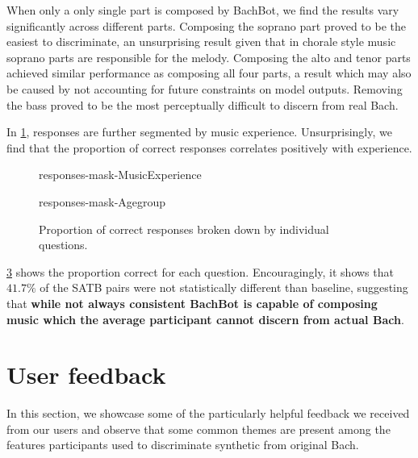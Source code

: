 When only a only single part is composed by BachBot, we find the results vary significantly
across different parts. Composing the soprano part proved to be the easiest to
discriminate, an unsurprising result given that in chorale style music soprano parts
are responsible for the melody. Composing the alto and tenor parts achieved
similar performance as composing all four parts, a result which may also be caused by
not accounting for future constraints on model outputs. Removing the bass proved
to be the most perceptually difficult to discern from real Bach.

In \cref{fig:responses-mask-musicExperience}, responses are further segmented
by music experience. Unsurprisingly, we find that the proportion of correct responses
correlates positively with experience.

\begin{figure}[tb]
  \centering
  
  \caption{responses-mask-MusicExperience}
  \label{fig:responses-mask-musicExperience}
\end{figure}

\begin{figure}[tb]
  \centering
  
  \caption{responses-mask-Agegroup}
  \label{fig:responses-mask-agegroup}
\end{figure}

\begin{figure}[tb]
  \centering
  
  \caption{Proportion of correct responses broken down by individual questions.}
  \label{fig:responses-name}
\end{figure}

\cref{fig:responses-name} shows the proportion correct for each question.
Encouragingly, it shows that $41.7\%$ of the SATB pairs were not
statistically different than baseline, suggesting that \textbf{while not always
consistent BachBot is capable of composing music which the average participant
cannot discern from actual Bach}.


\section{User feedback}

In this section, we showcase some of the particularly helpful feedback we
received from our users and observe that some common themes are present
among the features participants used to discriminate synthetic from original Bach.

